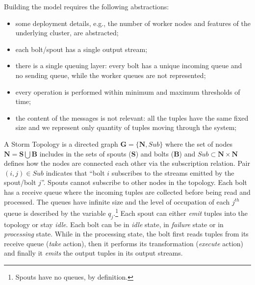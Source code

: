 Building the model requires the following abstractions:
\begin{itemize}
	\item some deployment details, e.g., the number of worker nodes and features of the underlying cluster, are abstracted;
	\item each bolt/spout has a single output stream;
	\item %
	there is a single queuing layer: every bolt has a unique incoming queue and no sending queue, while the worker queues are not represented;
	\item every operation is performed within minimum and maximum thresholds of time;
	\item %
	the content of the messages is not relevant: all the tuples have the same fixed size and we represent only quantity of tuples moving through the system;
\end{itemize}

A Storm Topology is a directed graph $\mathbf{G} = \{ \mathbf{N}, Sub\}$ where the set of nodes $\mathbf{N} = \mathbf{S}\bigcup \mathbf{B}$ includes in the sets of spouts (\textbf{S}) and bolts (\textbf{B}) and %
$Sub\subset\mathbf{N}\times\mathbf{N}$ defines how the nodes are connected each other via the subscription relation. Pair $(i,j)\in Sub$ indicates that ``bolt $i$ subscribes to the streams emitted by the spout/bolt $j$''. 
Spouts cannot subscribe to other nodes in the topology.
Each bolt has a receive queue where the incoming tuples are collected before being read and processed. %
The queues have infinite size and the level of occupation of each $j^{th}$ queue is described by the variable $q_j$.\footnote{Spouts have no queues, by definition.}
Each spout can either \textit{emit} tuples into the topology or stay \emph{idle}.
Each bolt can be in \emph{idle} state, in \emph{failure} state or in  \emph{processing} state.  While in the processing state, the bolt first reads tuples from its receive queue (\textit{take} action), then it performs its transformation (\textit{execute} action) and finally it \textit{emits} the output tuples in its output streams. \\

